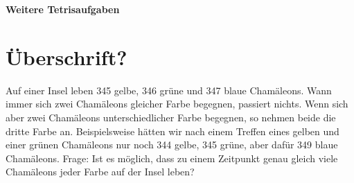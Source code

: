 \documentclass[a4paper,ngerman,12pt]{scrartcl}
\theoremstyle{definition}
\theoremstyle{plain}
\theoremstyle{remark}
\begin{document}
\textbf{Weitere Tetrisaufgaben}


\section{Überschrift?}

Auf einer Insel leben 345 gelbe, 346 grüne und 347 blaue Chamäleons. Wann immer sich zwei Chamäleons gleicher Farbe begegnen, passiert nichts. Wenn sich aber zwei Chamäleons unterschiedlicher Farbe begegnen, so nehmen beide die dritte Farbe an. Beispielsweise hätten wir nach einem Treffen eines gelben und einer grünen Chamäleons nur noch 344 gelbe, 345 grüne, aber dafür 349 blaue Chamäleons. Frage: Ist es möglich, dass zu einem Zeitpunkt genau gleich viele Chamäleons jeder Farbe auf der Insel leben?

\end{document}
